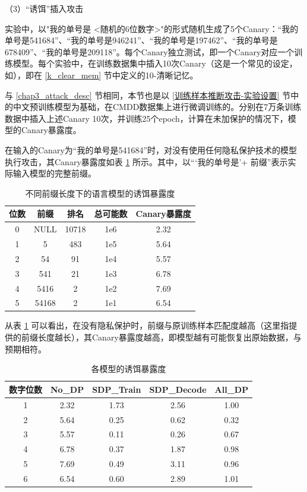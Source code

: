 （3）“诱饵”插入攻击

实验中，以"我的单号是 <随机的6位数字>"的形式随机生成了5个Canary：“我的单号是541684”、“我的单号是946241”、“我的单号是197462”、“我的单号是678409”、“我的单号是209118”。每个Canary独立测试，即一个Canary对应一个训练模型。每个实验中，在训练数据集中插入10次Canary（这是一个常见的设定，如\cite{selectivedp}），即在 \ref{k_clear_mem} 节中定义的10-清晰记忆。

与 \ref{chap3_attack_desc} 节相同，本节也是以 \ref{训练样本推断攻击-实验设置} 节中的中文预训练模型为基础，在CMDD数据集上进行微调训练的。分别在7万条训练数据中插入上述Canary 10次，并训练25个epoch，计算在未加保护的情况下，模型的Canary暴露度。

在输入的Canary为“我的单号是541684”时，对没有使用任何隐私保护技术的模型执行攻击，其Canary暴露度如表 \ref{Prefix_Attack_Canary} 所示。其中，以“‘我的单号是’+ 前缀”表示实际输入模型的完整前缀。

\begin{table}[]
	\centering
	\caption{不同前缀长度下的语言模型的诱饵暴露度}
	\begin{tabular}{|c|c|c|c|c|}
		\hline
		位数&前缀&排名&总可能数&Canary暴露度   \\ \hline
		0&NULL&10718&1e6&2.32    \\ \hline
		1&5&483&1e5&5.64    \\ \hline
		2&54&91&1e4&5.57    \\ \hline
		3&541&21&1e3&6.78   \\ \hline
		4&5416&2&1e2&7.69    \\ \hline
		5&54168&2&1e1&6.54	    \\ \hline
	\end{tabular}
	\label{Prefix_Attack_Canary}
\end{table}

从表 \ref{Prefix_Attack_Canary} 可以看出，在没有隐私保护时，前缀与原训练样本匹配度越高（这里指提供的前缀长度越长），其Canary暴露度越高，即模型越有可能恢复出原始数据，与预期相符。

\begin{table}[]
	\centering
	\caption{各模型的诱饵暴露度}
	\begin{tabular}{|c|c|c|c|c|}
		\hline
		数字位数&No\_DP&SDP\_Train&SDP\_Decode&All\_DP   \\ \hline
		1&2.32&1.73&2.56&1.00    \\ \hline
		2&5.64&0.25&0.62&0.32    \\ \hline
		3&5.57&0.11&0.26&0.67    \\ \hline
		4&6.78&0.37&1.87&0.98   \\ \hline
		5&7.69&0.49&3.11&0.96   \\ \hline
		6&6.54&0.60&2.89&1.01   \\ \hline
	\end{tabular}
	\label{Chap5_DP_Canary_Num}
\end{table}

